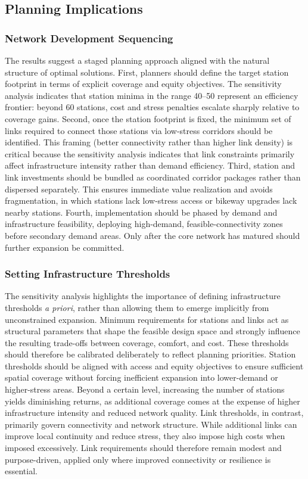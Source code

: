 \documentclass[preprint,authoryear,10pt]{elsarticle}
\begin{document}
\subsection{Planning Implications}

\subsubsection{Network Development Sequencing}

The results suggest a staged planning approach aligned with the natural structure of optimal solutions. First, planners should define the target station footprint in terms of explicit coverage and equity objectives. The sensitivity analysis indicates that station minima in the range 40--50 represent an efficiency frontier: beyond 60 stations, cost and stress penalties escalate sharply relative to coverage gains. Second, once the station footprint is fixed, the minimum set of links required to connect those stations via low-stress corridors should be identified. This framing (better connectivity rather than higher link density) is critical because the sensitivity analysis indicates that link constraints primarily affect infrastructure intensity rather than demand efficiency. Third, station and link investments should be bundled as coordinated corridor packages rather than dispersed separately. This ensures immediate value realization and avoids fragmentation, in which stations lack low-stress access or bikeway upgrades lack nearby stations. Fourth, implementation should be phased by demand and infrastructure feasibility, deploying high-demand, feasible-connectivity zones before secondary demand areas. Only after the core network has matured should further expansion be committed.

\subsubsection{Setting Infrastructure Thresholds}

The sensitivity analysis highlights the importance of defining infrastructure thresholds \textit{a priori}, rather than allowing them to emerge implicitly from unconstrained expansion. Minimum requirements for stations and links act as structural parameters that shape the feasible design space and strongly influence the resulting trade-offs between coverage, comfort, and cost. These thresholds should therefore be calibrated deliberately to reflect planning priorities. Station thresholds should be aligned with access and equity objectives to ensure sufficient spatial coverage without forcing inefficient expansion into lower-demand or higher-stress areas. Beyond a certain level, increasing the number of stations yields diminishing returns, as additional coverage comes at the expense of higher infrastructure intensity and reduced network quality. Link thresholds, in contrast, primarily govern connectivity and network structure. While additional links can improve local continuity and reduce stress, they also impose high costs when imposed excessively. Link requirements should therefore remain modest and purpose-driven, applied only where improved connectivity or resilience is essential.
\end{document}

